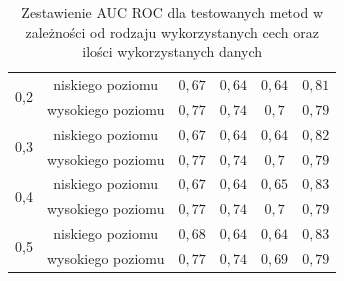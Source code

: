 \begin{table}[]
\begin{tabular}{|c|c|c|c|c|c|}
\multirow{2}{*}{0,2}   & niskiego poziomu  &  $ 0,67 $ & $ 0,64 $ & $ 0,64 $ &$ 0,81 $ \\ \cline{2-6} 
                       & wysokiego poziomu &  $ 0,77 $ & $ 0,74 $ & $ 0,7 $ &$ 0,79 $ \\ \hline
                       
\multirow{2}{*}{0,3}   & niskiego poziomu  &  $ 0,67 $ & $ 0,64 $ & $ 0,64 $ &$ 0,82 $ \\ \cline{2-6} 
                       & wysokiego poziomu &  $ 0,77 $ & $ 0,74 $ & $ 0,7 $ &$ 0,79 $ \\ \hline
                       
\multirow{2}{*}{0,4}   & niskiego poziomu  & $ 0,67 $ & $ 0,64 $ & $ 0,65 $ &$ 0,83 $ \\ \cline{2-6} 
                       & wysokiego poziomu &  $ 0,77 $ & $ 0,74 $ & $ 0,7 $ &$ 0,79 $ \\ \hline
                       
\multirow{2}{*}{0,5}   & niskiego poziomu  &  $ 0,68 $ & $ 0,64 $ & $ 0,64 $ &$ 0,83 $ \\ \cline{2-6} 
                       & wysokiego poziomu &  $ 0,77 $ & $ 0,74 $ & $ 0,69 $ &$ 0,79 $ \\ \hline
\end{tabular}

\caption{Zestawienie AUC ROC dla testowanych metod w zależności od rodzaju wykorzystanych cech oraz ilości wykorzystanych danych}
\label{table:higgstable}

\end{table}


